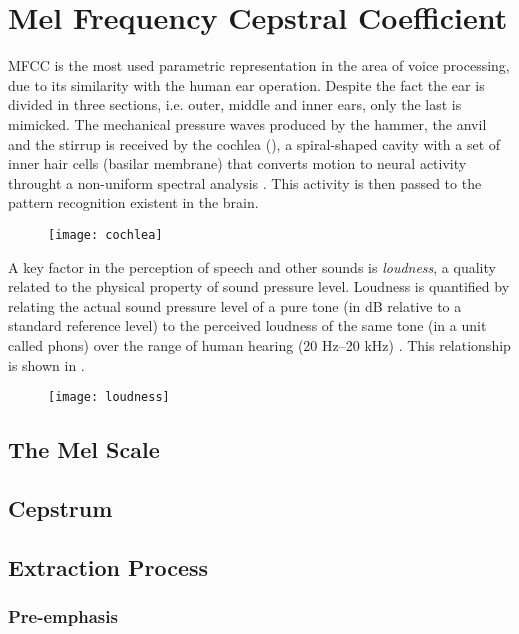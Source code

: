 \section{Mel Frequency Cepstral Coefficient}

MFCC is the most used parametric representation in the area of voice processing,
due to its similarity with the human ear operation. Despite the fact the ear is
divided in three sections, i.e. outer, middle and inner ears, only the last is
mimicked. The mechanical pressure waves produced by the hammer, the anvil and the
stirrup is received by the cochlea (), a spiral-shaped cavity
with a set of inner hair cells (basilar membrane) that converts motion to neural
activity throught a non-uniform spectral analysis \autocite{rabiner.schafer.2007}.
This activity is then passed to the pattern recognition existent in the brain.

\begin{figure}[ht]
    \centering
    \texttt{[image: cochlea]}
    \caption{}
    \label{fig:cochlea}
\end{figure}

A key factor in the perception of speech and other sounds is \emph{loudness}, a
quality related to the physical property of sound pressure level. Loudness is
quantified by relating the actual sound pressure level of a pure tone (in dB
relative to a standard reference level) to the perceived loudness of the same
tone (in a unit called phons) over the range of human hearing (20 Hz–20 kHz)
\autocite{rabiner.schafer.2007}. This relationship is shown in .

\begin{figure}[ht]
    \centering
    \texttt{[image: loudness]}
    \caption{}
    \label{fig:loudness}
\end{figure}


\subsection{The Mel Scale}


\subsection{Cepstrum}


\subsection{Extraction Process}


\subsubsection{Pre-emphasis}